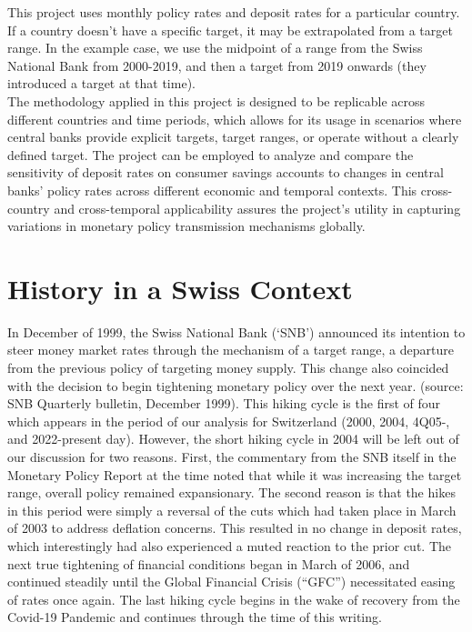 \documentclass{article}
\begin{document}
This project uses monthly policy rates and deposit rates for a particular country. If a country doesn't have a specific target, it may be extrapolated from a target range. In the example case, we use the midpoint of a range from the Swiss National Bank from 2000-2019, and then a target from 2019 onwards (they introduced a target at that time).\\

The methodology applied in this project is designed to be replicable across different countries and time periods, which allows for its usage in scenarios where central banks provide explicit targets, target ranges, or operate without a clearly defined target. The project can be employed to analyze and compare the sensitivity of deposit rates on consumer savings accounts to changes in central banks’ policy rates across different economic and temporal contexts. This cross-country and cross-temporal applicability assures the project's utility in capturing variations in monetary policy transmission mechanisms globally.

\section{History in a Swiss Context}

In December of 1999, the Swiss National Bank (‘SNB’) announced its intention to steer money market rates through the mechanism of a target range, a departure from the previous policy of targeting money supply. This change also coincided with the decision to begin tightening monetary policy over the next year. (source: SNB Quarterly bulletin, December 1999). This hiking cycle is the first of four which appears in the period of our analysis for Switzerland (2000, 2004, 4Q05-, and 2022-present day). However, the short hiking cycle in 2004 will be left out of our discussion for two reasons. First, the commentary from the SNB itself in the Monetary Policy Report at the time noted that while it was increasing the target range, overall policy remained expansionary. The second reason is that the hikes in this period were simply a reversal of the cuts which had taken place in March of 2003 to address deflation concerns. This resulted in no change in deposit rates, which interestingly had also experienced a muted reaction to the prior cut. The next true tightening of financial conditions began in March of 2006, and continued steadily until the Global Financial Crisis (“GFC”) necessitated easing of rates once again. The last hiking cycle begins in the wake of recovery from the Covid-19 Pandemic and continues through the time of this writing.  
\end{document}
